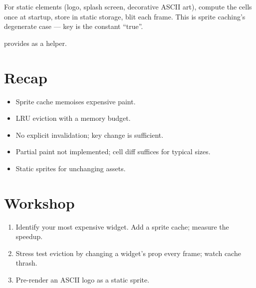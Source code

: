 For static elements (logo, splash screen, decorative ASCII
art), compute the cells once at startup, store in static
storage, blit each frame. This is sprite caching's degenerate
case --- key is the constant ``true''.

\maya{} provides  as a helper.

\section{Recap}

\begin{recap}
\begin{itemize}[leftmargin=*]
  \item Sprite cache memoises expensive paint.
  \item LRU eviction with a memory budget.
  \item No explicit invalidation; key change is sufficient.
  \item Partial paint not implemented; cell diff suffices
    for typical sizes.
  \item Static sprites for unchanging assets.
\end{itemize}
\end{recap}

\section*{Workshop}

\begin{enumerate}[leftmargin=*]
  \item Identify your most expensive widget. Add a sprite
    cache; measure the speedup.
  \item Stress test eviction by changing a widget's prop
    every frame; watch cache thrash.
  \item Pre-render an ASCII logo as a static sprite.
\end{enumerate}
